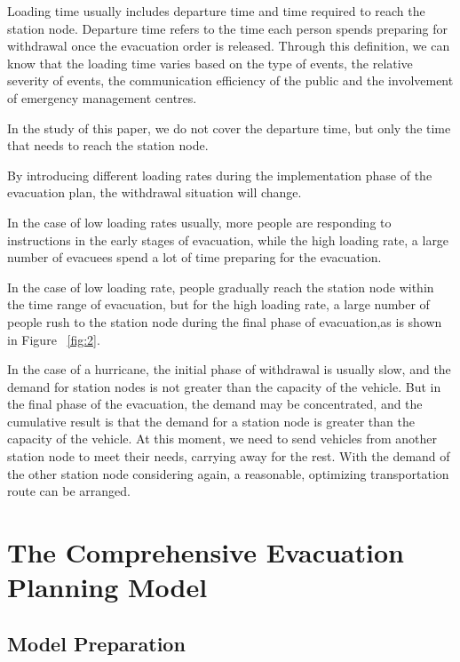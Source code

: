 \documentclass{mcmthesis}
\begin{document}
Loading time usually includes departure time and time required to reach the station node. Departure time refers to the time each person spends preparing for withdrawal once the evacuation order is released. Through this definition, we can know that the loading time varies based on the type of events, the relative severity of events, the communication efficiency of the public and the involvement of emergency management centres.

In the study of this paper, we do not cover the departure time, but only the time that needs to reach the station node.

By introducing different loading rates during the implementation phase of the evacuation plan, the withdrawal situation will change.

In the case of low loading rates usually, more people are responding to instructions in the early stages of evacuation, while the high loading rate, a large number of evacuees spend a lot of time preparing for the evacuation.

In the case of low loading rate, people gradually reach the station node within the time range of evacuation, but for the high loading rate, a large number of people rush to the station node during the final phase of evacuation,as is shown in Figure ~\ref{fig:2}.



In the case of a hurricane, the initial phase of withdrawal is usually slow, and the demand for station nodes is not greater than the capacity of the vehicle. But in the final phase of the evacuation, the demand may be concentrated, and the cumulative result is that the demand for a station node is greater than the capacity of the vehicle. At this moment, we need  to send vehicles from another station node to meet their needs, carrying away for the rest. With the demand of the other station node considering again, a reasonable, optimizing transportation route can be arranged.

\section{The Comprehensive Evacuation Planning Model}
\subsection{Model Preparation}
\end{document}
